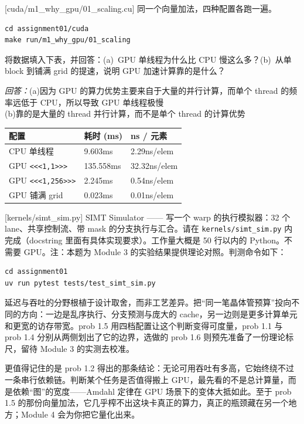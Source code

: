 \documentclass[11pt,a4paper,fontset=none]{ctexart}
\begin{document}
[cuda/m1\_why\_gpu/01\_scaling.cu]
同一个向量加法，四种配置各跑一遍。

\begin{lstlisting}
cd assignment01/cuda
make run/m1_why_gpu/01_scaling
\end{lstlisting}

将数据填入下表，并回答：(a)~GPU 单线程为什么比 CPU 慢这么多？(b)~从单 block 到铺满 grid 的提速，说明 GPU 加速计算靠的是什么？
\par\noindent\textit{回答：}(a)因为 GPU 的算力优势主要来自于大量的并行计算，而单个 thread 的频率远低于 CPU，所以导致 GPU 单线程极慢 \\
(b)靠的是大量的 thread 并行计算，而不是单个 thread 的计算优势

\begin{center}\small
\begin{tabular}{@{}lll@{}}
\toprule
配置 & 耗时 (ms) & ns / 元素 \\
\midrule
CPU 单线程 & 9.603ms & 2.29ns/elem\\
GPU \texttt{<<<1,1>>>} & 135.558ms & 32.32ns/elem\\
GPU \texttt{<<<1,256>>>} & 2.245ms & 0.54ns/elem\\
GPU 铺满 grid & 0.023ms & 0.01ns/elem\\
\bottomrule
\end{tabular}
\end{center}

[kernels/simt\_sim.py]
SIMT Simulator —— 写一个 warp 的执行模拟器：32 个 lane、共享控制流、带 mask 的分支执行与汇合。请在 \texttt{kernels/simt\_sim.py} 内完成（docstring 里面有具体实现要求）。工作量大概是 50 行以内的 Python。不需要 GPU。注：本题为 Module 3 的实验结果提供理论对照。判测命令如下：

\begin{lstlisting}
cd assignment01
uv run pytest tests/test_simt_sim.py
\end{lstlisting}

\begin{lookback}
延迟与吞吐的分野根植于设计取舍，而非工艺差异。把“同一笔晶体管预算”投向不同的方向：一边是乱序执行、分支预测与庞大的 cache，另一边则是更多计算单元和更宽的访存带宽。prob 1.5 用四档配置让这个判断变得可度量，prob 1.1 与 prob 1.4 分别从两侧划出了它的边界，选做的 prob 1.6 则预先准备了一份理论标尺，留待 Module 3 的实测去校准。

更值得记住的是 prob 1.2 得出的那条结论：无论可用吞吐有多高，它始终绕不过一条串行依赖链。判断某个任务是否值得搬上 GPU，最先看的不是总计算量，而是依赖“图”的宽度——Amdahl 定律在 GPU 场景下的变体大抵如此。至于 prob 1.5 的那份向量加法，它几乎榨不出这块卡真正的算力，真正的瓶颈藏在另一个地方；Module 4 会为你把它量化出来。
\end{lookback}
\end{document}
